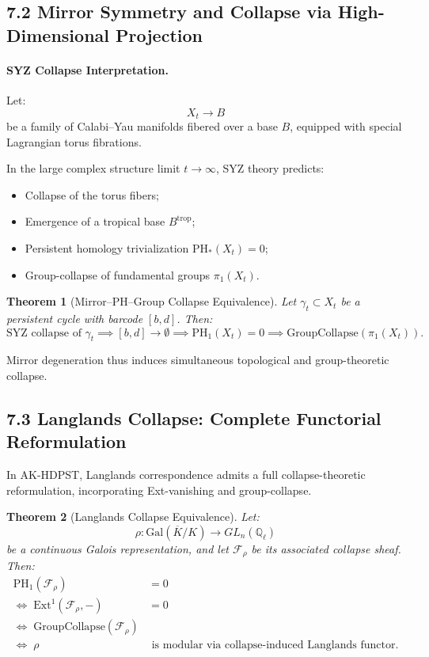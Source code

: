 \documentclass[11pt]{article}
\newtheorem{theorem}{Theorem}[section]
\begin{document}
\subsection*{7.2 Mirror Symmetry and Collapse via High-Dimensional Projection}

\paragraph{SYZ Collapse Interpretation.}
Let:
\[
X_t \longrightarrow B
\]
be a family of Calabi–Yau manifolds fibered over a base \( B \), equipped with special Lagrangian torus fibrations.

In the large complex structure limit \( t \to \infty \), SYZ theory predicts:

\begin{itemize}
    \item Collapse of the torus fibers;
    \item Emergence of a tropical base \( B^{\mathrm{trop}} \);
    \item Persistent homology trivialization \( \mathrm{PH}_*(X_t) = 0 \);
    \item Group-collapse of fundamental groups \( \pi_1(X_t) \).
\end{itemize}

\begin{theorem}[Mirror–PH–Group Collapse Equivalence]
Let \( \gamma_t \subset X_t \) be a persistent cycle with barcode \( [b,d] \). Then:
\[
\text{SYZ collapse of } \gamma_t \implies [b,d] \to \emptyset \implies \mathrm{PH}_1(X_t) = 0 \implies \text{GroupCollapse}(\pi_1(X_t)).
\]
\end{theorem}

Mirror degeneration thus induces simultaneous topological and group-theoretic collapse.

\subsection*{7.3 Langlands Collapse: Complete Functorial Reformulation}

In AK-HDPST, Langlands correspondence admits a full collapse-theoretic reformulation, incorporating Ext-vanishing and group-collapse.

\begin{theorem}[Langlands Collapse Equivalence]
Let:
\[
\rho: \mathrm{Gal}(\overline{K}/K) \longrightarrow GL_n(\mathbb{Q}_\ell)
\]
be a continuous Galois representation, and let \( \mathcal{F}_\rho \) be its associated collapse sheaf. Then:
\begin{align*}
\mathrm{PH}_1(\mathcal{F}_\rho) &= 0 \\
\iff\; \mathrm{Ext}^1(\mathcal{F}_\rho, -) &= 0 \\
\iff\; \mathrm{GroupCollapse}(\mathcal{F}_\rho) \\
\iff\; \rho &\text{ is modular via collapse-induced Langlands functor}.
\end{align*}
\end{theorem}
\end{document}
